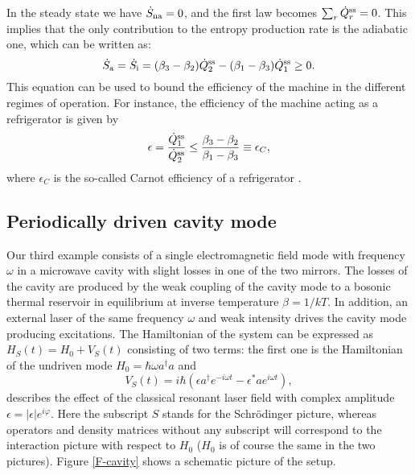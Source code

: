 \documentclass[aps,prx,twocolumn,showpacs,floatfix,superscriptaddress,graphics,longbibliography]{revtex4-1}
\begin{document}
In the steady state we have $\dot{S}_{\rm na} = 0$, and the first law becomes $\sum_r \dot{Q}_r^{\rm ss} = 0$. 
This implies that the only contribution to the entropy production rate is the adiabatic one, which can be written as:
\begin{equation}\label{SL_steady}
\dot{S}_{\rm a} = \dot{S}_{\rm i} = (\beta_3 - \beta_2)\dot{Q}_2^{\rm ss} - (\beta_1 - \beta_3) \dot{Q}_1^{\rm ss} \geq 0.
\end{equation}
This equation can be used to bound the efficiency of the machine in the different regimes of operation. For instance, the efficiency of the machine acting as a refrigerator  is given by
\begin{equation}\label{efbound}
\epsilon = \frac{\dot{Q}_1^{\rm ss}}{\dot{Q}_2^{\rm ss}} \leq \frac{\beta_3 - \beta_2}{\beta_1 - \beta_3} \equiv \epsilon_C,
\end{equation}
where $\epsilon_C$ is the so-called Carnot efficiency  of a refrigerator \cite{VirtualQubits}. 




\subsection{Periodically driven cavity mode} \label{S-cavity}

Our third example consists of a single electromagnetic field mode with frequency $\omega$ in a microwave cavity with slight losses in one of the two mirrors. 
The losses of the cavity are produced by the weak coupling of the cavity mode to a bosonic thermal reservoir in equilibrium at inverse temperature 
$\beta = 1/k T$. In addition, an external laser of the same frequency $\omega$ and weak intensity drives 
the cavity mode producing excitations. The Hamiltonian of the system can be expressed as $H_S(t) = H_0 + V_S(t)$ consisting of two terms: 
the first one is the Hamiltonian of the undriven mode $H_0 = \hbar \omega a^\dagger a$ and 
\begin{equation}
V_S(t) = i \hbar (\epsilon a^\dagger e^{-i\omega t} - \epsilon^{\ast} a e^{i \omega t}),
\end{equation}
describes the effect of the classical resonant laser field with complex amplitude $\epsilon = |\epsilon| e^{i \varphi}$. Here the subscript $S$ stands for the Schr\"odinger picture, whereas operators and density matrices without any subscript will correspond to the interaction picture with respect to $H_0$ ($H_0$ is of course the same in the two pictures). Figure \ref{F-cavity} shows a schematic picture of the setup.
\end{document}
